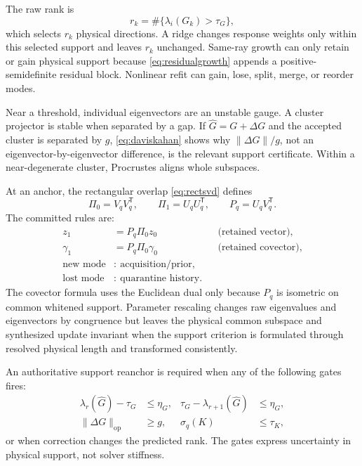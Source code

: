 \documentclass[10pt,twocolumn]{article}
\theoremstyle{definition}
\theoremstyle{remark}
\newcommand{\op}{\mathrm{op}}
\begin{document}
The raw rank is
\begin{equation}
 r_k=\#\{\lambda_i(G_k)>\tau_G\},
 \label{eq:rawrank}
\end{equation}
which selects $r_k$ physical directions.  A ridge changes response weights only within this selected support and leaves $r_k$ unchanged.  Same-ray growth can only retain or gain physical support because \eqref{eq:residualgrowth} appends a positive-semidefinite residual block.  Nonlinear refit can gain, lose, split, merge, or reorder modes.

Near a threshold, individual eigenvectors are an unstable gauge.  A cluster projector is stable when separated by a gap.  If $\widehat G=G+\Delta G$ and the accepted cluster is separated by $g$, \eqref{eq:daviskahan} shows why $\|\Delta G\|/g$, not an eigenvector-by-eigenvector difference, is the relevant support certificate.  Within a near-degenerate cluster, Procrustes aligns whole subspaces.

At an anchor, the rectangular overlap \eqref{eq:rectsvd} defines
\begin{equation}
 \Pi_0=V_qV_q^{\mathsf T},\qquad
 \Pi_1=U_qU_q^{\mathsf T},\qquad
 P_q=U_qV_q^{\mathsf T}.
 \label{eq:commonsupport}
\end{equation}
The committed rules are:
\begin{align}
 z_1&=P_q\Pi_0z_0
 &&\text{(retained vector)},\nonumber\\
 \gamma_1&=P_q\Pi_0\gamma_0
 &&\text{(retained covector)},\nonumber\\
 \text{new mode}&:\ \text{acquisition/prior},\nonumber\\
 \text{lost mode}&:\ \text{quarantine history}.
 \label{eq:rankrules}
\end{align}
The covector formula uses the Euclidean dual only because $P_q$ is isometric on common whitened support.  Parameter rescaling changes raw eigenvalues and eigenvectors by congruence but leaves the physical common subspace and synthesized update invariant when the support criterion is formulated through resolved physical length and transformed consistently.

An authoritative support reanchor is required when any of the following gates fires:
\begin{align}
 \lambda_r(\widehat G)-\tau_G&\le\eta_G,&
 \tau_G-\lambda_{r+1}(\widehat G)&\le\eta_G,\nonumber\\
 \|\Delta G\|_{\op}&\ge g,&
 \sigma_q(K)&\le\tau_K,
 \label{eq:rankgates}
\end{align}
or when correction changes the predicted rank.  The gates express uncertainty in physical support, not solver stiffness.
\end{document}
